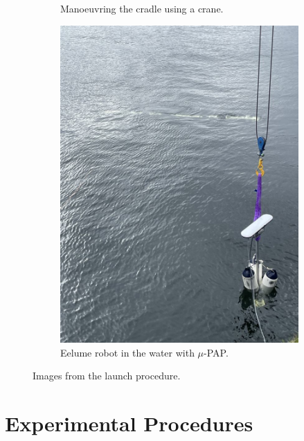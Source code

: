 \begin{figure}
\begin{subfigure}{0.26\textwidth}
        \caption{Manoeuvring the cradle using a crane.}
    \end{subfigure}
    \begin{subfigure}{0.26\textwidth}
        \centering
        \includegraphics[width=\textwidth]{assets/launch/1.jpeg}
        \caption{Eelume robot in the water with \(\mu\)-PAP.}
    \end{subfigure}
    \caption{Images from the launch procedure.}
    \label{fig:eelume:cradle-and-float}
\end{figure}

\section{Experimental Procedures}
\label{sec:experimental_setup:experimental_procedures}

